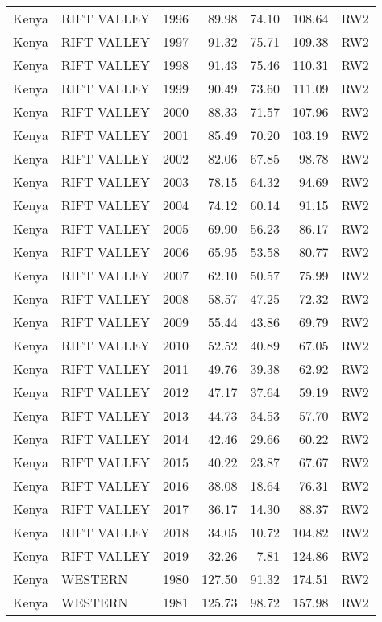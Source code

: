 \begin{longtable}{lllrrrl}
  Kenya & RIFT VALLEY & 1996 & 89.98 & 74.10 & 108.64 & RW2 \\ 
  Kenya & RIFT VALLEY & 1997 & 91.32 & 75.71 & 109.38 & RW2 \\ 
  Kenya & RIFT VALLEY & 1998 & 91.43 & 75.46 & 110.31 & RW2 \\ 
  Kenya & RIFT VALLEY & 1999 & 90.49 & 73.60 & 111.09 & RW2 \\ 
  Kenya & RIFT VALLEY & 2000 & 88.33 & 71.57 & 107.96 & RW2 \\ 
  Kenya & RIFT VALLEY & 2001 & 85.49 & 70.20 & 103.19 & RW2 \\ 
  Kenya & RIFT VALLEY & 2002 & 82.06 & 67.85 & 98.78 & RW2 \\ 
  Kenya & RIFT VALLEY & 2003 & 78.15 & 64.32 & 94.69 & RW2 \\ 
  Kenya & RIFT VALLEY & 2004 & 74.12 & 60.14 & 91.15 & RW2 \\ 
  Kenya & RIFT VALLEY & 2005 & 69.90 & 56.23 & 86.17 & RW2 \\ 
  Kenya & RIFT VALLEY & 2006 & 65.95 & 53.58 & 80.77 & RW2 \\ 
  Kenya & RIFT VALLEY & 2007 & 62.10 & 50.57 & 75.99 & RW2 \\ 
  Kenya & RIFT VALLEY & 2008 & 58.57 & 47.25 & 72.32 & RW2 \\ 
  Kenya & RIFT VALLEY & 2009 & 55.44 & 43.86 & 69.79 & RW2 \\ 
  Kenya & RIFT VALLEY & 2010 & 52.52 & 40.89 & 67.05 & RW2 \\ 
  Kenya & RIFT VALLEY & 2011 & 49.76 & 39.38 & 62.92 & RW2 \\ 
  Kenya & RIFT VALLEY & 2012 & 47.17 & 37.64 & 59.19 & RW2 \\ 
  Kenya & RIFT VALLEY & 2013 & 44.73 & 34.53 & 57.70 & RW2 \\ 
  Kenya & RIFT VALLEY & 2014 & 42.46 & 29.66 & 60.22 & RW2 \\ 
  Kenya & RIFT VALLEY & 2015 & 40.22 & 23.87 & 67.67 & RW2 \\ 
  Kenya & RIFT VALLEY & 2016 & 38.08 & 18.64 & 76.31 & RW2 \\ 
  Kenya & RIFT VALLEY & 2017 & 36.17 & 14.30 & 88.37 & RW2 \\ 
  Kenya & RIFT VALLEY & 2018 & 34.05 & 10.72 & 104.82 & RW2 \\ 
  Kenya & RIFT VALLEY & 2019 & 32.26 & 7.81 & 124.86 & RW2 \\ 
  Kenya & WESTERN & 1980 & 127.50 & 91.32 & 174.51 & RW2 \\ 
  Kenya & WESTERN & 1981 & 125.73 & 98.72 & 157.98 & RW2 \\ 

\end{longtable}
